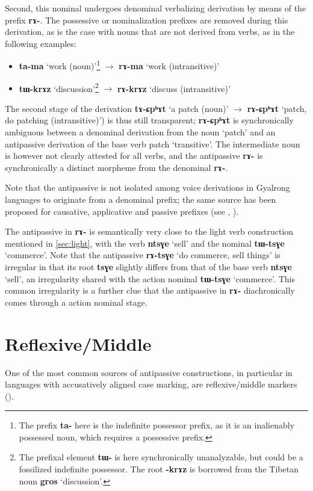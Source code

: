 \documentclass[oneside,a4paper,11pt]{article}
\newcommand{\ipa}[1]{{\phon\textbf{#1}}}
\begin{document}
Second, this nominal undergoes denominal verbalizing derivation by means of the prefix \ipa{rɤ-}. The possessive or nominalization prefixes are removed during this derivation, as is the case with nouns that are not derived from verbs, as in the following examples:
\begin{itemize}
\item \ipa{ta-ma} `work (noun)'\footnote{The prefix \ipa{ta-} here is the indefinite possessor prefix, as it is an inalienably possessed noun, which requires a possessive prefix. }  $\rightarrow$  \ipa{rɤ-ma} `work (intransitive)'
\item \ipa{tɯ-krɤz} `discussion'\footnote{The prefixal element \ipa{tɯ-} is here synchronically unanalyzable, but could be a fossilized indefinite possessor. The root \ipa{-krɤz} is borrowed from the Tibetan noun \ipa{gros} `discussion'. } $\rightarrow$ \ipa{rɤ-krɤz} `discuss (intransitive)'
\end{itemize}

The second stage of the derivation \ipa{tɤ-ɕpʰɤt} `a patch (noun)' $\rightarrow$ \ipa{rɤ-ɕpʰɤt} `patch, do patching (intransitive)') is thus still transparent; \ipa{rɤ-ɕpʰɤt} is synchronically ambiguous between a denominal derivation from the noun `patch' and an antipassive derivation of the base verb  patch `transitive'. The intermediate noun is however not clearly attested for all verbs, and the antipassive \ipa{rɤ-} is synchronically a distinct morpheme from the denominal \ipa{rɤ-}.

Note that the antipassive is not isolated among voice derivations in Gyalrong languages to originate from a denominal prefix; the same source has been proposed for causative, applicative and passive prefixes (see \citealt{jacques15causative}, \citealt{lai18denom}).

The antipassive in \ipa{rɤ-} is semantically very close to the light verb construction mentioned in \ref{sec:light}, with the verb \ipa{ntsɣe} `sell' and the nominal \ipa{tɯ-tsɣe} `commerce'. Note that the antipassive \ipa{rɤ-tsɣe} `do commerce, sell things' is irregular in that its root \ipa{tsɣe} slightly differs from that of the base verb \ipa{ntsɣe} `sell', an irregularity shared with the action nominal \ipa{tɯ-tsɣe} `commerce'. This common irregularity is a further clue that the antipassive in \ipa{rɤ-} diachronically comes through a action nominal stage.


\section{Reflexive/Middle}
One of the most common sources of antipassive constructions, in particular in languages with accusatively aligned case marking, are reflexive/middle markers (\citealt{janic16antipassif}). 
\end{document}
